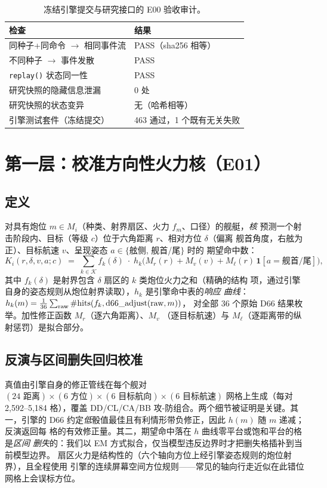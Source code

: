 \documentclass[12pt,a4paper]{ctexart}
\begin{document}
\begin{table}[!htb]
\centering\small
\caption{冻结引擎提交与研究接口的 E00 验收审计。}
\label{tab:e00}
\begin{tabular}{p{8.6cm}p{5.6cm}}
\toprule
检查 & 结果 \\
\midrule
同种子+同命令 $\to$ 相同事件流 & PASS（sha256 相等） \\
不同种子 $\to$ 事件发散 & PASS \\
\texttt{replay()} 状态同一性 & PASS \\
研究快照的隐藏信息泄漏 & 0 处 \\
研究快照的状态变异 & 无（哈希相等） \\
引擎测试套件（冻结提交） & 463 通过，1 个既有无关失败 \\
\bottomrule
\end{tabular}
\end{table}

\section{第一层：校准方向性火力核（E01）}\label{sec:kernel}

\subsection{定义}
对具有炮位 $m\in M_i$（种类、射界扇区、火力 $f_m$、口径）的舰艇，\emph{核}
预测一个射击阶段内、目标（等级 $c$）位于六角距离 $r$、相对方位 $\delta$（偏离
舰首角度，右舷为正）、目标航速 $v$、呈现姿态 $a\in\{$舷侧, 舰首/尾$\}$ 时的
期望命中数：
\begin{equation}
K_i(r,\delta,v,a;c)\;=\;\sum_{k\in\mathcal{K}}
f_k(\delta)\;\cdot\;h_{k}\!\big(M_r(r)+M_v(v)+M_\ell(r)\,\mathbf{1}[a=\text{舰首/尾}]\big),
\label{eq:kernel}
\end{equation}
其中 $f_k(\delta)$ 是射界包含 $\delta$ 扇区的 $k$ 类炮位火力之和（精确的结构
项，通过引擎自身的姿态规则从炮位射界读取），$h_k$ 是引擎命中表的\emph{响应
曲线}：$h_k(m)=\frac1{36}\sum_{\text{raw}}\#\text{hits}(f_k,\textnormal{d66\_adjust}(\text{raw},m))$，
对全部 36 个原始 D66 结果枚举。加性修正函数 $M_r$（逐六角距离）、$M_v$
（逐目标航速）与 $M_\ell$（逐距离带的纵射惩罚）是拟合部分。

\subsection{反演与区间删失回归校准}
真值由引擎自身的修正管线在每个舰对 $(24\text{ 距离})\times(6\text{ 方位})\times
(6\text{ 目标航向})\times(6\text{ 目标航速})$ 网格上生成（每对 2{,}592--5{,}184
格），覆盖 DD/CL/CA/BB 攻-防组合。两个细节被证明是关键。其一，引擎的 D66
约定\emph{低}骰值最佳且有利情形带负修正，因此 $h(m)$ 随 $m$ 递减；反演返回每
格的有效修正量。其二，期望命中落在 $h$ 曲线零平台或饱和平台的格是\emph{区间
删失}的：我们以 EM 方式拟合，仅当模型违反边界时才把删失格插补到当前模型边界。
扇区火力是结构性的（六个轴向方位上经引擎姿态规则的炮位射界），且全程使用
引擎的连续屏幕空间方位规则——常见的轴向行走近似在此错位网格上会误标方位。
\end{document}
